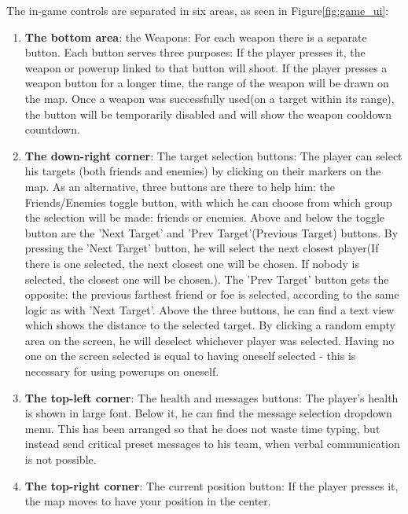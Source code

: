 The in-game controls are separated in six areas, as seen in Figure\ref{fig:game_ui}:

\begin{enumerate}
  \item \textbf{The bottom area}: the Weapons: For each weapon there is a
  separate button. Each button serves three purposes: If the player presses it,
  the weapon or powerup linked to that button will shoot. If the player presses
  a weapon button for a longer time, the range of the weapon will be drawn on
  the map. Once a weapon was successfully used(on a target within its range),
  the button will be temporarily disabled and will show the weapon cooldown
  countdown.
  
  \item \textbf{The down-right corner}: The target selection buttons: The player
  can select his targets (both friends and enemies) by clicking on their
  markers on the map. As an alternative, three buttons are there to help him:
  the Friends/Enemies toggle button, with which he can choose from which
  group the selection will be made: friends or enemies. Above and below the
  toggle button are the 'Next Target' and 'Prev Target'(Previous Target)
  buttons. By pressing the 'Next Target' button, he will select the next closest
  player(If there is one selected, the next closest one will be chosen. If
  nobody is selected, the closest one will be chosen.). The 'Prev Target' button
  gets the opposite: the previous farthest friend or foe is selected, according
  to the same logic as with 'Next Target'. Above the three buttons, he can find
  a text view which shows the distance to the selected target. By clicking a
  random empty area on the screen, he will deselect whichever player was
  selected. Having no one on the screen selected is equal to having oneself
  selected - this is necessary for using powerups on oneself.
  
  \item \textbf{The top-left corner}: The health and messages buttons: The
  player's health is shown in large font. Below it, he can find the message
  selection dropdown menu. This has been arranged so that he does not waste time
  typing, but instead send critical preset messages to his team, when verbal
  communication is not possible.
  
  \item \textbf{The top-right corner}: The current position button: If the
  player presses it, the map moves to have your position in the center.
  

\end{enumerate}
